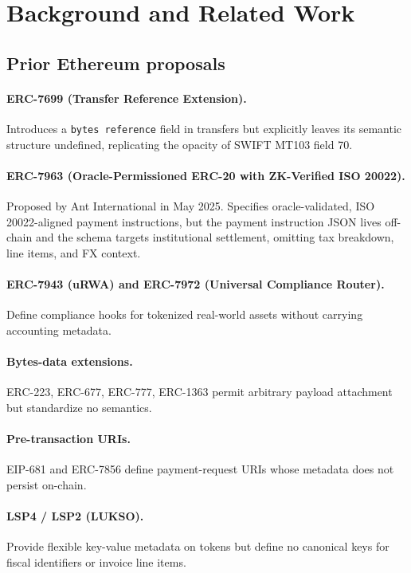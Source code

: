 \documentclass[11pt,a4paper]{article}
\begin{document}
\section{Background and Related Work}
\label{sec:related}

\subsection{Prior Ethereum proposals}

\paragraph{ERC-7699 (Transfer Reference Extension).} Introduces a \texttt{bytes reference} field in transfers but explicitly leaves its semantic structure undefined, replicating the opacity of SWIFT MT103 field 70.

\paragraph{ERC-7963 (Oracle-Permissioned ERC-20 with ZK-Verified ISO 20022).} Proposed by Ant International in May 2025. Specifies oracle-validated, ISO 20022-aligned payment instructions, but the payment instruction JSON lives off-chain and the schema targets institutional settlement, omitting tax breakdown, line items, and FX context.

\paragraph{ERC-7943 (uRWA) and ERC-7972 (Universal Compliance Router).} Define compliance hooks for tokenized real-world assets without carrying accounting metadata.

\paragraph{Bytes-data extensions.} ERC-223, ERC-677, ERC-777, ERC-1363 permit arbitrary payload attachment but standardize no semantics.

\paragraph{Pre-transaction URIs.} EIP-681 and ERC-7856 define payment-request URIs whose metadata does not persist on-chain.

\paragraph{LSP4 / LSP2 (LUKSO).} Provide flexible key-value metadata on tokens but define no canonical keys for fiscal identifiers or invoice line items.
\end{document}
